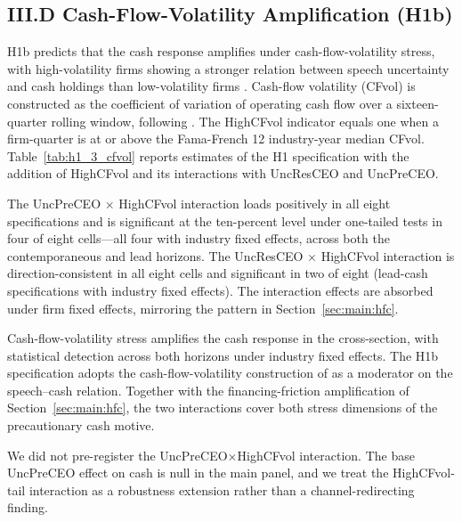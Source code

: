 \subsection*{III.D Cash-Flow-Volatility Amplification (H1b)}
\label{sec:main:cfvol}

H1b predicts that the cash response amplifies under cash-flow-volatility stress, with high-volatility firms showing a stronger relation between speech uncertainty and cash holdings than low-volatility firms \cite{hanqiu2007}. Cash-flow volatility (CFvol) is constructed as the coefficient of variation of operating cash flow over a sixteen-quarter rolling window, following . The HighCFvol indicator equals one when a firm-quarter is at or above the Fama-French 12 industry-year median CFvol. Table~\ref{tab:h1_3_cfvol} reports estimates of the H1 specification with the addition of HighCFvol and its interactions with UncResCEO and UncPreCEO.

The UncPreCEO $\times$ HighCFvol interaction loads positively in all eight specifications and is significant at the ten-percent level under one-tailed tests in four of eight cells---all four with industry fixed effects, across both the contemporaneous and lead horizons. The UncResCEO $\times$ HighCFvol interaction is direction-consistent in all eight cells and significant in two of eight (lead-cash specifications with industry fixed effects). The interaction effects are absorbed under firm fixed effects, mirroring the pattern in Section~\ref{sec:main:hfc}.

Cash-flow-volatility stress amplifies the cash response in the cross-section, with statistical detection across both horizons under industry fixed effects. The H1b specification adopts the cash-flow-volatility construction of  as a moderator on the speech--cash relation. Together with the financing-friction amplification of Section~\ref{sec:main:hfc}, the two interactions cover both stress dimensions of the precautionary cash motive.

We did not pre-register the UncPreCEO$\times$HighCFvol interaction. The base UncPreCEO effect on cash is null in the main panel, and we treat the HighCFvol-tail interaction as a robustness extension rather than a channel-redirecting finding.

